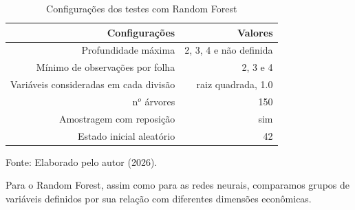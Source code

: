 \begin{table}[htbp]
	\centering
	\captionsetup{justification=centering}
	\caption{Configurações dos testes com Random Forest}
	\label{tab:configs_rf}
	
	\scriptsize
	\setlength{\tabcolsep}{2pt}
	\renewcommand{\arraystretch}{1.3}
	
	\begin{tabular}{rr}
		\toprule
		Configurações & Valores \\
		\midrule
		Profundidade máxima & 2, 3, 4 e não definida \\
		Mínimo de observações por folha & 2, 3 e 4 \\
		Variáveis consideradas em cada divisão & raiz quadrada, 1.0 \\
		n$^o$ árvores & 150 \\
		Amostragem com reposição & sim \\
		Estado inicial aleatório & 42 \\
		\bottomrule
	\end{tabular}
	
	
	\vspace{0.1cm}
	
	\small Fonte: Elaborado pelo autor (2026).
\end{table}



Para o Random Forest, assim como para as redes neurais, comparamos grupos de variáveis definidos por sua relação com diferentes dimensões econômicas.



